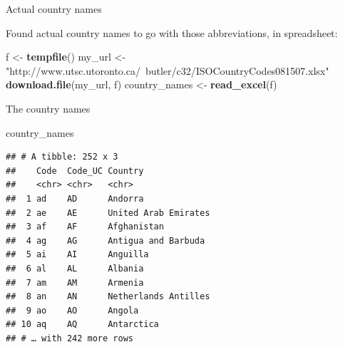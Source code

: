 \documentclass[ignorenonframetext,]{beamer}
\newenvironment{Shaded}{\begin{snugshade}}{\end{snugshade}}
\newcommand{\KeywordTok}[1]{\textcolor[rgb]{0.13,0.29,0.53}{\textbf{#1}}}
\newcommand{\NormalTok}[1]{#1}
\newcommand{\StringTok}[1]{\textcolor[rgb]{0.31,0.60,0.02}{#1}}
\begin{document}
\begin{frame}[fragile]{Actual country names}
\protect\hypertarget{actual-country-names}{}

Found actual country names to go with those abbreviations, in
spreadsheet:

\begin{Shaded}
\begin{Highlighting}[]
\NormalTok{f <-}\StringTok{ }\KeywordTok{tempfile}\NormalTok{()}
\NormalTok{my_url <-}\StringTok{ "http://www.utsc.utoronto.ca/~butler/c32/ISOCountryCodes081507.xlsx"}
\KeywordTok{download.file}\NormalTok{(my_url, f)}
\NormalTok{country_names <-}\StringTok{ }\KeywordTok{read_excel}\NormalTok{(f)}
\end{Highlighting}
\end{Shaded}

\end{frame}

\begin{frame}[fragile]{The country names}
\protect\hypertarget{the-country-names}{}

\begin{Shaded}
\begin{Highlighting}[]
\NormalTok{country_names}
\end{Highlighting}
\end{Shaded}

\begin{verbatim}
## # A tibble: 252 x 3
##    Code  Code_UC Country             
##    <chr> <chr>   <chr>               
##  1 ad    AD      Andorra             
##  2 ae    AE      United Arab Emirates
##  3 af    AF      Afghanistan         
##  4 ag    AG      Antigua and Barbuda 
##  5 ai    AI      Anguilla            
##  6 al    AL      Albania             
##  7 am    AM      Armenia             
##  8 an    AN      Netherlands Antilles
##  9 ao    AO      Angola              
## 10 aq    AQ      Antarctica          
## # … with 242 more rows
\end{verbatim}

\end{frame}
\end{document}
